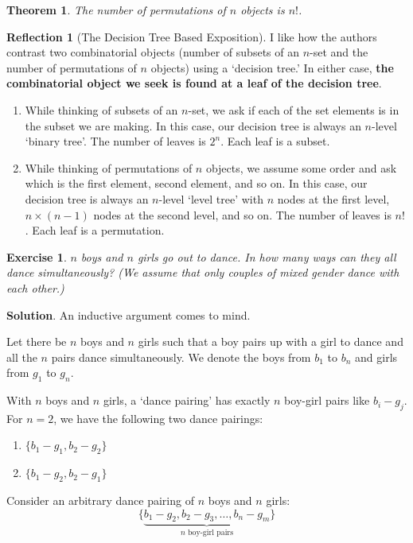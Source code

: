 \documentclass[11pt]{book}
\theoremstyle{definition}
\theoremstyle{plain}
\newtheorem{theorem}{Theorem}
\newtheorem{exercise}{Exercise}
\theoremstyle{definition}
\theoremstyle{problemstyle}
\theoremstyle{remark}
\theoremstyle{definition}
\newtheorem{reflection}{Reflection}
\begin{document}
\begin{theorem}
The number of permutations of $n$ objects is $n!$.
    \label{th:n-perms}
\end{theorem}

\begin{reflection}[The Decision Tree Based Exposition]
    I like how the authors contrast two combinatorial objects (number of subsets of an $n$-set and the number of permutations of $n$ objects) using a `decision tree.' In either case, \textbf{the combinatorial object we seek is found at a leaf of the decision tree}.
    \begin{enumerate}
    \item While thinking of subsets of an $n$-set, we ask if each of the set elements is in the subset we are making. In this case, our decision tree is always an $n$-level `binary tree'. The number of leaves is $2^n$. Each leaf is a subset.
    \item While thinking of permutations of $n$ objects, we assume some order and ask which is the first element, second element, and so on. In this case, our decision tree is always an $n$-level `level tree' with $n$ nodes at the first level, $n\times(n-1)$ nodes at the second level, and so on. The number of leaves is $n!$. Each leaf is a permutation.
    \end{enumerate}
\end{reflection}
\begin{exercise}
    \label{ex:1.6.1}
    $n$ boys and $n$ girls go out to dance. In how many ways can they all dance simultaneously? (We assume that only couples of mixed gender dance with each other.)
\end{exercise}
\textbf{Solution}.
An inductive argument comes to mind.

Let there be $n$ boys and $n$ girls such that a boy pairs up with a girl to dance and all the $n$ pairs dance simultaneously. We denote the boys from $b_1$ to $b_n$ and girls from $g_1$ to $g_n$. 

With $n$ boys and $n$ girls, a `dance pairing' has exactly $n$ boy-girl pairs like $b_i-g_j$. For $n=2$, we have the following two dance pairings:
\begin{enumerate}
    \item $\{b_1-g_1,b_2-g_2\}$
    \item $\{b_1-g_2,b_2-g_1\}$
\end{enumerate}

Consider an arbitrary dance pairing of $n$ boys and $n$ girls:
\[
    \{\underbrace{b_1-g_2,b_2-g_3,\dots,b_n-g_m}_{n\text{ boy-girl pairs}}\}
\]
\end{document}
